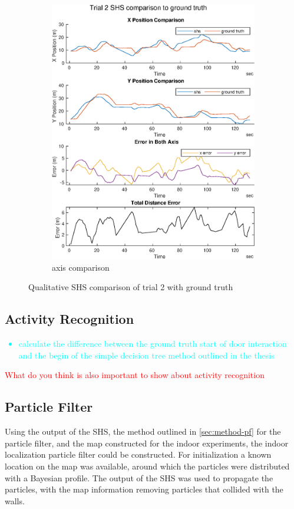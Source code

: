 \begin{figure}[]
\begin{subfigure}[t]{.45\textwidth}
		\includegraphics[width=\linewidth]{images/20201029_1042_trial2_shs_2}
		\caption{axis comparison}
		\label{fig:trial2_comparison}
	\end{subfigure}
	\caption{Qualitative SHS comparison of trial 2 with ground truth}
	\label{fig:trial2_shs_gt_comparison}
\end{figure}

\newpage
\subsection{Activity Recognition}
\textcolor{cyan}{
\begin{itemize}
	\item calculate the difference between the ground truth start of door interaction and the begin of the simple decision tree method outlined in the thesis
\end{itemize}}

\textcolor{red}{What do you think is also important to show about activity recognition}

\subsection{Particle Filter}
Using the output of the SHS, the method outlined in \cref{sec:method-pf} for the particle filter, and the map constructed for the indoor experiments, the indoor localization particle filter could be constructed. For initialization a known location on the map was available, around which the particles were distributed with a Bayesian profile. The output of the SHS was used to propagate the particles, with the map information removing particles that collided with the walls. \\
 

